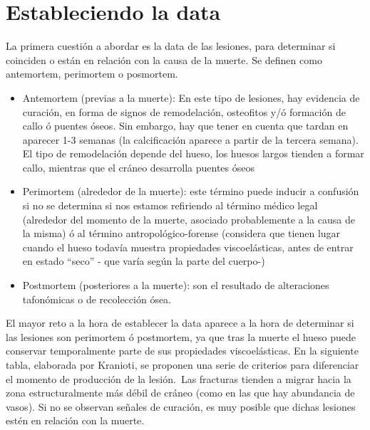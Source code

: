 \section{Estableciendo la data}
La primera cuestión a abordar es la data de las lesiones, para determinar si coinciden o están en relación con la causa de la muerte. Se definen como antemortem, perimortem o posmortem.\
\begin{itemize}
	\item Antemortem (previas a la muerte): En este tipo de lesiones, hay evidencia de curación, en forma de signos de remodelación, osteofitos y/ó formación de callo ó puentes óseos. Sin embargo, hay que tener en cuenta que tardan en aparecer 1-3 semanas (la calcificación aparece a partir de la tercera semana).  El tipo de remodelación depende del hueso, los huesos largos tienden a formar callo, mientras que el cráneo desarrolla puentes óseos \cite{Kranioti2015}
	\item Perimortem (alrededor de la muerte): este término puede inducir a confusión si no se determina si nos estamos refiriendo al término médico legal (alrededor del momento de la muerte, asociado probablemente a la causa de la misma) ó al término antropológico-forense (considera que tienen lugar cuando el hueso todavía muestra propiedades viscoelásticas, antes de entrar en estado “seco” - que varía según la parte del cuerpo-) \cite{Kranioti2015}
	\item Postmortem (posteriores a la muerte): son el resultado de alteraciones tafonómicas o de recolección ósea. 
\end{itemize}
El mayor reto a la hora de establecer la data aparece a la hora de determinar si las lesiones son perimortem ó postmortem, ya que tras la muerte el hueso puede conservar temporalmente parte de sus propiedades viscoelásticas. En la siguiente tabla, elaborada por Kranioti\cite{Kranioti2015}, se proponen una serie de criterios para diferenciar el momento de producción de la lesión.\
Las fracturas tienden a migrar hacia la zona estructuralmente más débil de cráneo (como en las que hay abundancia de vasos). Si no se observan señales de curación, es muy posible que dichas lesiones estén en relación con la muerte. 
